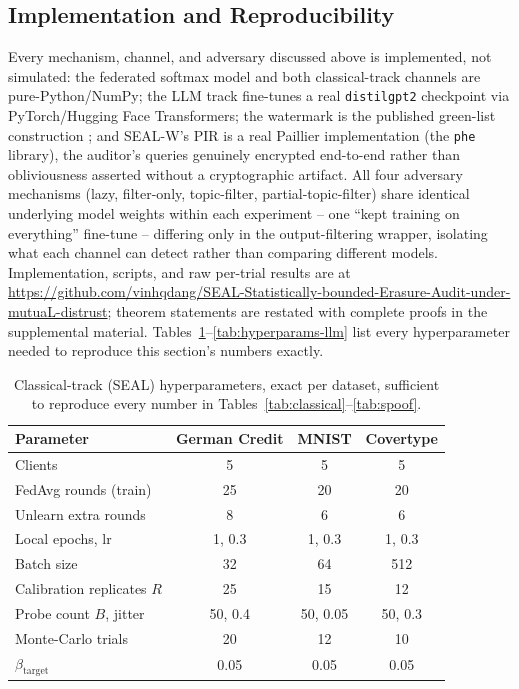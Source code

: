 \documentclass[10pt,journal,compsoc]{IEEEtran}
\begin{document}
\subsection{Implementation and Reproducibility}

Every mechanism, channel, and adversary discussed above is implemented, not simulated: the federated softmax model and both classical-track channels are pure-Python/NumPy; the LLM track fine-tunes a real \texttt{distilgpt2} checkpoint via PyTorch/Hugging Face Transformers; the watermark is the published green-list construction \cite{kirchenbauer2023watermark}; and SEAL-W's PIR is a real Paillier implementation (the \texttt{phe} library), the auditor's queries genuinely encrypted end-to-end rather than obliviousness asserted without a cryptographic artifact. All four adversary mechanisms (lazy, filter-only, topic-filter, partial-topic-filter) share identical underlying model weights within each experiment -- one ``kept training on everything'' fine-tune -- differing only in the output-filtering wrapper, isolating what each channel can detect rather than comparing different models. Implementation, scripts, and raw per-trial results are at \url{https://github.com/vinhqdang/SEAL-Statistically-bounded-Erasure-Audit-under-mutuaL-distrust}; theorem statements are restated with complete proofs in the supplemental material. Tables~\ref{tab:hyperparams-classical}--\ref{tab:hyperparams-llm} list every hyperparameter needed to reproduce this section's numbers exactly.

\begin{table}[t]
\centering
\footnotesize
\caption{Classical-track (SEAL) hyperparameters, exact per dataset, sufficient to reproduce every number in Tables~\ref{tab:classical}--\ref{tab:spoof}.}
\label{tab:hyperparams-classical}
\begin{tabular}{@{}lccc@{}}
\toprule
Parameter & German Credit & MNIST & Covertype \\
\midrule
Clients & 5 & 5 & 5 \\
FedAvg rounds (train) & 25 & 20 & 20 \\
Unlearn extra rounds & 8 & 6 & 6 \\
Local epochs, lr & 1, 0.3 & 1, 0.3 & 1, 0.3 \\
Batch size & 32 & 64 & 512 \\
Calibration replicates $R$ & 25 & 15 & 12 \\
Probe count $B$, jitter & 50, 0.4 & 50, 0.05 & 50, 0.3 \\
Monte-Carlo trials & 20 & 12 & 10 \\
$\beta_{\text{target}}$ & 0.05 & 0.05 & 0.05 \\
\bottomrule
\end{tabular}
\end{table}
\end{document}
